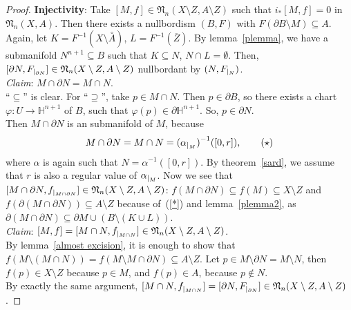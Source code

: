 \documentclass[a4paper,12pt]{article}
\begin{document}
\begin{proof}
    \noindent\textbf{Injectivity}: Take \([M,f]\in\mathfrak{N}_n(X\setminus Z, A\setminus Z)\) such that \(i_\ast[M,f]=0\) in \(\mathfrak{N}_n(X,A)\). Then there exists %
    a nullbordism \((B,F)\) with \(F(\partial B\setminus M)\subseteq A\).\\
    Again, let \(K=F^{-1}(X\setminus\overset{\circ}A)\), \(L=F^{-1}(\overline{Z})\). By lemma\ \ref{plemma}, we have a submanifold \(N^{n+1}\subseteq B\) such that \(K\subseteq N\), \(N\cap L=\emptyset\). Then, \([\partial N,F_{|_{\partial N}}]\in\mathfrak{N}_n(X\setminus Z, A\setminus Z)\) nullbordant by \((N,F_{|_{N}})\).\\
    \emph{Claim}: \(M\cap\partial N=M\cap N\).\\
    \enquote{\(\subseteq\)} is clear. For \enquote{\(\supseteq\)}, take \(p\in M\cap N\). Then \(p\in\partial B\), so there exists a chart \(\varphi:U\to\mathbb{H}^{n+1}\) of \(B\), such that \(\varphi(p)\in\partial\mathbb{H}^{n+1}\). So, \(p\in\partial N\).\\
    Then \(M\cap\partial N\) is an submanifold of \(M\), because
    \begin{equation}\label{*}
        M\cap\partial N= M\cap N={(\alpha_{|_{M}})}^{-1}([0,r]),\tag{$\star$}
    \end{equation}
    where \(\alpha\) is again such that \(N=\alpha^{-1}([0,r])\). 
    By theorem\ \ref{sard}, we assume that \(r\) is also a regular value of \(\alpha_{|_{M}}\). Now we see that \([M\cap\partial N,f_{|_{M\cap\partial N}}]\in\mathfrak{N}_n(X\setminus Z,A\setminus Z)\): \(f(M\cap\partial N)\subseteq f(M)\subseteq X\setminus Z\) and \(f(\partial(M\cap\partial N))\subseteq A\setminus Z\) because of\ (\ref{*}) and lemma\ \ref{plemma2}, as \(\partial(M\cap\partial N)\subseteq\partial M\cup(B\setminus (K\cup L))\).\\
    \textit{Claim}: 
    \([M,f]=[M\cap N,f_{|_{M\cap N}}]\in\mathfrak{N}_n(X\setminus Z,A\setminus Z)\). \\
    By lemma\ \ref{almost excision}, it is enough to show that 
    \(f(M\setminus(M\cap N))=f(M\setminus M\cap \partial N)\subseteq A\setminus Z\). 
    Let \(p\in M\setminus\partial N=M\setminus N\), then \(f(p)\in X\setminus Z\) because \(p\in M\), and \(f(p)\in A\), because \(p\notin N\).\\
    By exactly the same argument, \([M\cap N,f_{|_{M\cap N}}]=[\partial N,F_{|_{\partial N}}]\in\mathfrak{N}_n(X\setminus Z,A\setminus Z)\). 

\end{proof}
\end{document}
